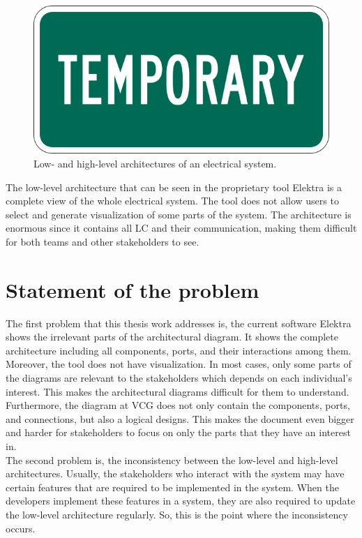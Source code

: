 \begin{figure}[H]
\centering
\captionsetup{justification=centering}
\vspace{0cm}%
\includegraphics[width=0.4\linewidth]{figure/temp.png}
\caption{Low- and high-level architectures of an electrical system.}
\end{figure}

The low-level architecture that can be seen in the proprietary tool Elektra is a complete view of the whole electrical system. The tool does not allow users to select and generate visualization of some parts of the system. The architecture is enormous since it contains all LC and their communication, making them difficult for both teams and other stakeholders to see. 

\section{Statement of the problem} \label{Statement_ref}
The first problem that this thesis work addresses is, the current software Elektra shows the irrelevant parts of the architectural diagram. It shows the complete architecture including all components, ports, and their interactions among them. Moreover, the tool does not have visualization. In most cases, only some parts of the diagrams are relevant to the stakeholders which depends on each individual’s interest. This makes the architectural diagrams difficult for them to understand. Furthermore, the diagram at VCG does not only contain the components, ports, and connections, but also a logical designs. This makes the document even bigger and harder for stakeholders to focus on only the parts that they have an interest in. \\ 

The second problem is, the inconsistency between the low-level and high-level architectures. Usually, the stakeholders who interact with the system may have certain features that are required to be implemented in the system. When the developers implement these features in a system, they are also required to update the low-level architecture regularly. So, this is the point where the inconsistency occurs. 

